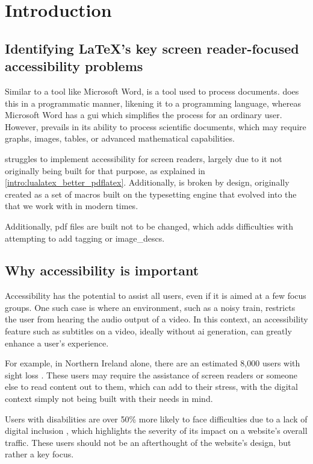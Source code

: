 \section{\nmu Introduction \nmu}\label{intro}
\subsection{Identifying \LaTeX's key screen reader-focused accessibility problems}
Similar to a tool like Microsoft Word, \latexspaced is a tool used to process documents. \latexspaced does this in a programmatic manner, likening it to a programming language, whereas Microsoft Word has a \acrfull{gui} which simplifies the process for an ordinary user. However, \latexspaced prevails in its ability to process scientific documents, which may require graphs, images, tables, or advanced mathematical capabilities.

\latexspaced struggles to implement accessibility for screen readers, largely due to it not originally being built for that purpose, as explained in \cref{intro:lualatex_better_pdflatex}. Additionally, \latexspaced is broken by design, originally created as a set of macros built on the \texspaced typesetting engine that evolved into the \lualatexspaced that we work with in modern times.

Additionally, \acrfull{pdf} files are built not to be changed, which adds difficulties with attempting to add \gls{tagging} or \glspl{image_desc}.

\subsection{Why accessibility is important}
Accessibility has the potential to assist all users, even if it is aimed at a few focus groups. One such case is where an environment, such as a noisy train, restricts the user from hearing the audio output of a video. In this context, an accessibility feature such as subtitles on a video, ideally without \acrfull{ai} generation, can greatly enhance a user's experience.

For example, in Northern Ireland alone, there are an estimated 8,000 users with sight loss \parencite{accessibility_importance}. These users may require the assistance of screen readers or someone else to read content out to them, which can add to their stress, with the digital context simply not being built with their needs in mind.

Users with disabilities are over 50\% more likely to face difficulties due to a lack of digital inclusion \parencite{accessibility_importance}, which highlights the severity of its impact on a website's overall traffic. These users should not be an afterthought of the website's design, but rather a key focus.

